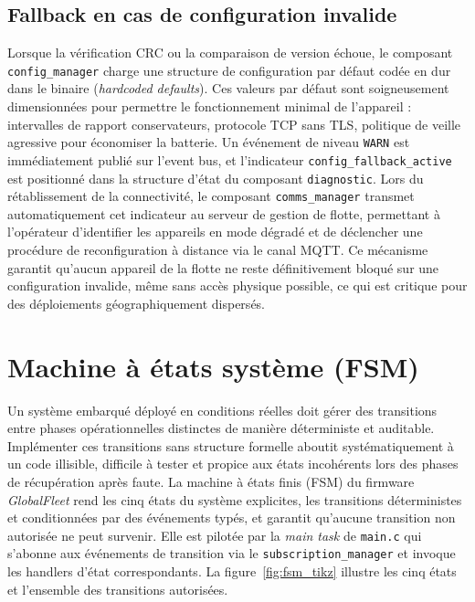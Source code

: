 \subsection{Fallback en cas de configuration invalide}
\label{subsec:fallback}

Lorsque la vérification CRC ou la comparaison de version échoue, le
composant \texttt{config\_manager} charge une structure de
configuration par défaut codée en dur dans le binaire
(\textit{hardcoded defaults}). Ces valeurs par défaut sont
soigneusement dimensionnées pour permettre le fonctionnement minimal
de l'appareil : intervalles de rapport conservateurs, protocole TCP
sans TLS, politique de veille agressive pour économiser la batterie.
Un événement de niveau \texttt{WARN} est immédiatement publié sur
l'event bus, et l'indicateur \texttt{config\_fallback\_active} est
positionné dans la structure d'état du composant \texttt{diagnostic}.
Lors du rétablissement de la connectivité, le composant
\texttt{comms\_manager} transmet automatiquement cet indicateur au
serveur de gestion de flotte, permettant à l'opérateur d'identifier
les appareils en mode dégradé et de déclencher une procédure de
reconfiguration à distance via le canal MQTT. Ce mécanisme garantit
qu'aucun appareil de la flotte ne reste définitivement bloqué sur une
configuration invalide, même sans accès physique possible, ce qui est
critique pour des déploiements géographiquement dispersés.

\section{Machine à états système (FSM)}
\label{sec:fsm}

Un système embarqué déployé en conditions réelles doit gérer des
transitions entre phases opérationnelles distinctes de manière
déterministe et auditable. Implémenter ces transitions sans structure
formelle aboutit systématiquement à un code illisible, difficile à
tester et propice aux états incohérents lors des phases de
récupération après faute. La machine à états finis (FSM) du firmware
\textit{GlobalFleet} rend les cinq états du système explicites, les
transitions déterministes et conditionnées par des événements typés,
et garantit qu'aucune transition non autorisée ne peut survenir. Elle
est pilotée par la \textit{main task} de \texttt{main.c} qui
s'abonne aux événements de transition via le \texttt{subscription\_manager}
et invoque les handlers d'état correspondants. La figure~\ref{fig:fsm_tikz}
illustre les cinq états et l'ensemble des transitions autorisées.

